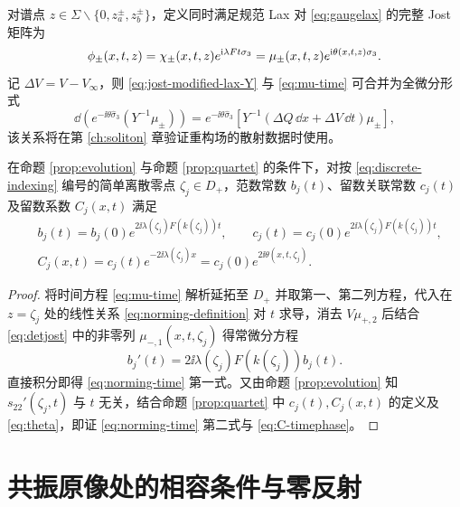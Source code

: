 \begin{remark}
对谱点 $z\in\Sigma\mathbin{\backslash}\{0,z_a^\pm,z_b^\pm\}$，定义同时满足规范 Lax 对 \eqref{eq:gaugelax} 的完整 Jost 矩阵为
\begin{equation}\label{eq:full-jost}
\phi_\pm(x,t,z)=\chi_\pm(x,t,z)e^{\mathrm{i}\lambda Ft\sigma_3}
=\mu_\pm(x,t,z)e^{\mathrm{i}\theta(x,t,z)\sigma_3}.
\end{equation}
记 $\Delta V=V-V_\infty$，则 \eqref{eq:jost-modified-lax-Y} 与 \eqref{eq:mu-time} 可合并为全微分形式
\begin{equation}\label{eq:jost-total-differential}
\dd\!\left(e^{-\ii\theta\widehat{\sigma}_3}(Y^{-1}\mu_\pm)\right)
=e^{-\ii\theta\widehat{\sigma}_3}\!\left[Y^{-1}(\Delta Q\,\dd x+\Delta V\,\dd t)\mu_\pm\right],
\end{equation}
该关系将在第 \ref{ch:soliton} 章验证重构场的散射数据时使用。
\end{remark}

\begin{proposition}\label{prop:norming-evolution}
在命题 \ref{prop:evolution} 与命题 \ref{prop:quartet} 的条件下，对按 \eqref{eq:discrete-indexing} 编号的简单离散零点 $\zeta_j\in D_+$，范数常数 $b_j(t)$、留数关联常数 $c_j(t)$ 及留数系数 $C_j(x,t)$ 满足
\begin{align}
&b_j(t)=b_j(0)e^{2\ii\lambda(\zeta_j)F(k(\zeta_j))t},\qquad
c_j(t)=c_j(0)e^{2\ii\lambda(\zeta_j)F(k(\zeta_j))t},\label{eq:norming-time}\\
&C_j(x,t)=c_j(t)e^{-2\ii\lambda(\zeta_j)x}
=c_j(0)e^{2\ii\theta(x,t,\zeta_j)}.\label{eq:C-timephase}
\end{align}
\end{proposition}
\begin{proof}
将时间方程 \eqref{eq:mu-time} 解析延拓至 $D_+$ 并取第一、第二列方程，代入在 $z=\zeta_j$ 处的线性关系 \eqref{eq:norming-definition} 对 $t$ 求导，消去 $V\mu_{+,2}$ 后结合 \eqref{eq:detjost} 中的非零列 $\mu_{-,1}(x,t,\zeta_j)$ 得常微分方程
\begin{equation*}
b_j'(t)=2\ii\lambda(\zeta_j)F(k(\zeta_j))b_j(t).
\end{equation*}
直接积分即得 \eqref{eq:norming-time} 第一式。又由命题 \ref{prop:evolution} 知 $s_{22}'(\zeta_j,t)$ 与 $t$ 无关，结合命题 \ref{prop:quartet} 中 $c_j(t),C_j(x,t)$ 的定义及 \eqref{eq:theta}，即证 \eqref{eq:norming-time} 第二式与 \eqref{eq:C-timephase}。
\end{proof}

\section{共振原像处的相容条件与零反射}

